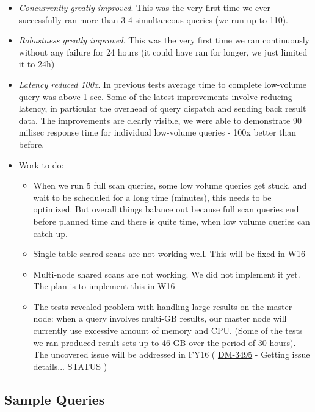 \begin{itemize}
\item
  \emph{Concurrently greatly improved}. This was the very first time we
  ever successfully ran more than 3-4 simultaneous queries (we run up to
  110).
\item
  \emph{Robustness greatly improved}. This was the very first time we
  ran continuously without any failure for 24 hours (it could have ran
  for longer, we just limited it to 24h)
\item
  \emph{Latency reduced 100x}. In previous tests average time to
  complete low-volume query was above 1 sec. Some of the latest
  improvements involve reducing latency, in particular the overhead of
  query dispatch and sending back result data. The improvements are
  clearly visible, we were able to demonstrate 90 milisec response time
  for individual low-volume queries - 100x better than before.
\item
  Work to do:

  \begin{itemize}
  \item
    When we run 5 full scan queries, some low volume queries get stuck,
    and wait to be scheduled for a long time (minutes), this needs to be
    optimized. But overall things balance out because full scan queries
    end before planned time and there is quite time, when low volume
    queries can catch up.
  \item
    Single-table scared scans are not working well. This will be fixed
    in W16
  \item
    Multi-node shared scans are not working. We did not implement it
    yet. The plan is to implement this in W16
  \item
    The tests revealed problem with handling large results on the master
    node: when a query involves multi-GB results, our master node will
    currently use excessive amount of memory and CPU. (Some of the tests
    we ran produced result sets up to 46 GB over the period of 30
    hours). The uncovered issue will be addressed in FY16 (
    \href{https://jira.lsstcorp.org/browse/DM-3495}{DM-3495} - Getting
    issue details... STATUS )~
  \end{itemize}
\end{itemize}

\subsection{Sample Queries}\label{sample-queries}

